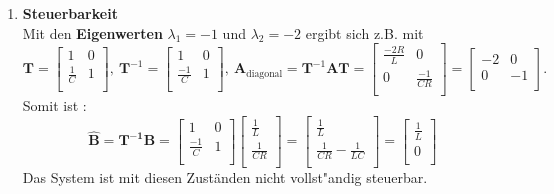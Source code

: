 {\begin{enumerate}
 \item[]{\bf Steuerbarkeit}\\ Mit den {\bf Eigenwerten} $\lambda_1=-1$ und  $\lambda_2=-2$ ergibt sich z.B. mit\\
\begin{equation*}
\boldsymbol{T}=\left [
\begin{array}{cc}
 1  & 0\\
\frac{1}{C} & 1\\
\end{array}
\right ],~
\boldsymbol{T}^{-1}=\left [
 \begin{array}{cc}
  1 & 0\\
 \frac{-1}{C} & 1 \\
\end{array}
\right ],~
\boldsymbol{A}_{\text{diagonal}}=\boldsymbol{T}^{-1}\boldsymbol{AT}
=\left [
 \begin{array}{cc}
  \frac{-2R}{L}& 0\\
 0 & \frac{-1}{CR} \\
\end{array}
\right ] 
=\left [
 \begin{array}{cc}
  -2 & 0\\
 0 & -1 \\
\end{array}
\right ].
\end{equation*}
Somit ist :
\begin{equation*}
\boldsymbol{\hat{B}}=\boldsymbol{T^{-1}B}=\left [
\begin{array}{cc}
 1  & 0\\
\frac{-1}{C} & 1\\
\end{array}
\right ]
\left [
\begin{array}{c}
 \frac{1}{L}\\
\frac{1}{CR}\\
\end{array}
\right ]=
\left [
\begin{array}{c}
 \frac{1}{L}\\
\frac{1}{CR}-\frac{1}{LC}\\
\end{array}
\right ]=
\left [
\begin{array}{c}
 \frac{1}{L}\\
 0 \\
\end{array}
\right ]
\end{equation*}
Das System ist mit diesen Zust\"anden nicht vollst"andig steuerbar. \\

\end{enumerate}}
